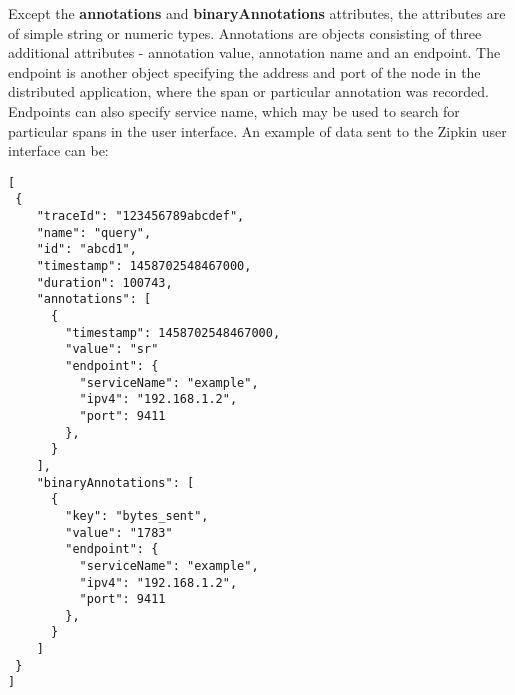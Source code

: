 Except the \textbf{annotations} and \textbf{binaryAnnotations} attributes, the attributes are of simple string or numeric types. Annotations are objects consisting of three additional attributes - annotation value, annotation name and an endpoint. The endpoint is another object specifying the address and port of the node in the distributed application, where the span or particular annotation was recorded. Endpoints can also specify service name, which may be used to search for particular spans in the user interface. An example of data sent to the Zipkin user interface can be:
\begin{lstlisting}[emph={traceId, name, id, timestamp, duration, annotations, value, endpoint, serviceName, ipv4, port, binnaryAnnotations, key},emphstyle={\textbf}]
[
 {
    "traceId": "123456789abcdef",
    "name": "query",
    "id": "abcd1",
    "timestamp": 1458702548467000,
    "duration": 100743,
    "annotations": [
      {
        "timestamp": 1458702548467000,
        "value": "sr"
        "endpoint": {
          "serviceName": "example",
          "ipv4": "192.168.1.2",
          "port": 9411
        },
      }
    ],
    "binaryAnnotations": [
      {
        "key": "bytes_sent",
        "value": "1783"
        "endpoint": {
          "serviceName": "example",
          "ipv4": "192.168.1.2",
          "port": 9411
        },
      }
    ]
 }
]
\end{lstlisting}


